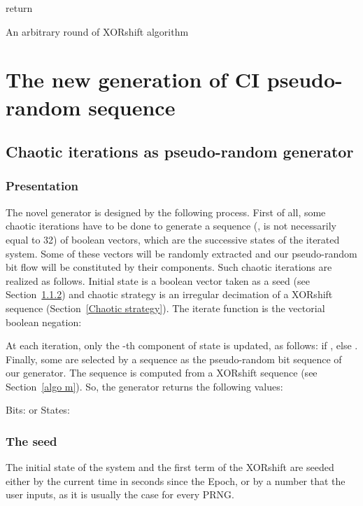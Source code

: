 \documentclass[10pt, a4paper, conference, compsocconf]{IEEEtran}
\begin{document}
\begin{algorithm}
\SetAlgoLined
{}
\;
\;
\;
\;
return \;
\medskip
\caption{An arbitrary round of XORshift algorithm}
\label{XORshift2}
\end{algorithm}






\section{The new generation of CI pseudo-random sequence}
\label{The generation of pseudo-random sequence}
\subsection{Chaotic iterations as pseudo-random generator}
\subsubsection{Presentation}
The novel generator is designed by the following process. First of all, some chaotic iterations have to be done to generate a sequence  (,  is not necessarily equal to 32) of boolean vectors, which are the successive states of the iterated system. Some of these vectors will be randomly extracted and our pseudo-random bit flow will be constituted by their components. Such chaotic iterations are realized as follows. Initial state  is a boolean vector taken as a seed (see Section~\ref{algo seed}) and chaotic strategy  is 
an irregular decimation of a XORshift sequence (Section~\ref{Chaotic strategy}). The iterate function  is 
the vectorial boolean negation:

At each iteration, only the -th component of state  is updated, as follows:  if , else .
Finally, some  are selected 
by a sequence  as the pseudo-random bit sequence of our generator. The sequence 
 is computed from a XORshift sequence  (see Section~\ref{algo m}). So, the 
generator returns the following values:\newline
\begin{small}
Bits:
or States:
\end{small}


\subsubsection{The seed}
\label{algo seed}
The initial state of the system  and the first term  of the XORshift are seeded either by 
the current time in seconds since the Epoch, or by a number that the user inputs, as it is usually the case for every PRNG.
\end{document}

